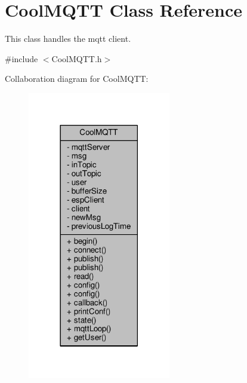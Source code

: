 \hypertarget{classCoolMQTT}{}\section{Cool\+M\+Q\+TT Class Reference}
\label{classCoolMQTT}


This class handles the mqtt client.  




{\ttfamily \#include $<$Cool\+M\+Q\+T\+T.\+h$>$}



Collaboration diagram for Cool\+M\+Q\+TT\+:\nopagebreak
\begin{figure}[H]
\begin{center}
\leavevmode
\includegraphics[width=177pt]{classCoolMQTT__coll__graph}
\end{center}
\end{figure}
